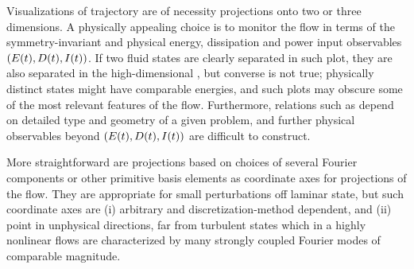 Visualizations of trajectory  are of necessity
projections onto two or three dimensions. A physically appealing
choice is to monitor the flow in terms of the
symmetry-invariant and physical energy, dissipation and power input
observables $(E(t),D(t),I(t))$.
If two fluid states are clearly separated in
such plot, they are also separated in the high-dimensional \statesp, but
converse is not true; physically distinct states might have comparable
energies, and such plots may obscure some of the most relevant features
of the flow. Furthermore, relations such as  depend on
detailed type and geometry of a given problem,
and further physical observables beyond $(E(t),D(t),I(t))$
are difficult to construct.

More straightforward are projections based on choices of several Fourier
components  or other primitive basis elements as
coordinate axes for projections of the flow. They are appropriate for
small perturbations off laminar state, but such coordinate axes are (i)
arbitrary and discretization-method dependent, and (ii) point in
unphysical directions, far from turbulent states which in a highly
nonlinear flows are characterized by  many strongly coupled Fourier modes
of comparable magnitude.

